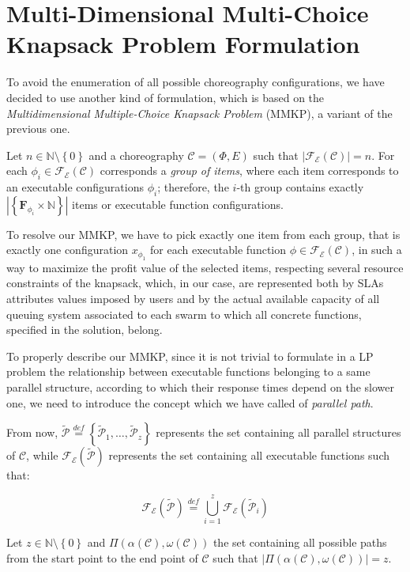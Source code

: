 \documentclass[12pt,a4paper]{report}
\newcommand{\mathDef}{\overset{\textit{def}}{=}}
\newcommand{\N}{\mathbb{N}}
\newcommand{\SetMinusZero}{\setminus \left\{0\right\}}
\begin{document}
\section{Multi-Dimensional Multi-Choice Knapsack Problem Formulation}\label{MMKKSection}

To avoid the enumeration of all possible choreography configurations, we have decided to use another kind of formulation, which is based on the \textit{Multidimensional Multiple-Choice Knapsack Problem} (MMKP), a variant of the previous one. 

Let $n \in \N \setminus \left\{0\right\}$ and a choreography $\mathcal{C} = (\Phi,E)$ such that $|\mathscr{F_E}(\mathcal{C})| = n$. For each $\phi_i \in \mathscr{F_E}(\mathcal{C})$ corresponds a \textit{group of items}, where each item corresponds to an executable configurations $\phi_i$; therefore, the $i$-th group contains exactly $|\left\{ \textbf{F}_{\phi_{i}} \times \N \right\}|$ items or executable function configurations.

To resolve our MMKP, we have to pick exactly one item from each group, that is exactly one configuration $x_{\phi_1}$ for each executable function $\phi \in \mathscr{F_E}(\mathcal{C})$, in such a way to maximize the profit value of the selected items, respecting several resource constraints of the knapsack, which, in our case, are represented both by SLAs attributes values imposed by users and by the actual available capacity of all queuing system associated to each swarm to which all concrete functions, specified in the solution, belong.

To properly describe our MMKP, since it is not trivial to formulate in a LP problem the relationship between executable functions belonging to a same parallel structure, according to which their response times depend on the slower one, we need to introduce the concept which we have called of \textit{parallel path}.

From now, $\mathcal{\widetilde{P}} \mathDef \left\{\mathcal{\widetilde{P}}_1,\ldots,\mathcal{\widetilde{P}}_z \right\}$ represents the set containing all parallel structures of $\mathcal{C}$, while $\mathscr{F_E}(\mathcal{\widetilde{P}})$ represents the set containing all executable functions such that:

\begin{equation}
\mathscr{F_E}(\mathcal{\widetilde{P}}) \mathDef \bigcup_{i=1}^z \mathscr{F_E}(\mathcal{\widetilde{P}}_i)
\end{equation}

Let $z \in \N \SetMinusZero$ and $\Pi(\alpha(\mathcal{C}),\omega(\mathcal{C}))$ the set containing all possible paths from the start point to the end point of $\mathcal{C}$ such that $|\Pi(\alpha(\mathcal{C}),\omega(\mathcal{C}))| = z$. 
\end{document}
